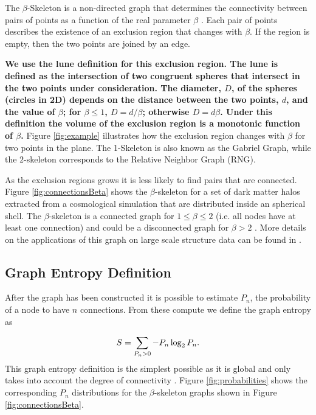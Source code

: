 \documentclass[fleqn,usenatbib]{mnras}
\begin{document}
The $\beta$-Skeleton is a non-directed graph that determines the
connectivity between pairs of points as a function of the real
parameter $\beta$ \citep{1985Kirkpatrick}. 
Each pair of points describes the existence of an exclusion region
that changes with $\beta$.  
If the region is empty, then the two points are joined by an edge. 

\textbf{We use the lune definition for this exclusion region.
The lune is defined as the intersection of two congruent spheres that
intersect in the two points under consideration.
The diameter, $D$, of the spheres (circles in 2D) depends on the
distance between the two points, $d$, and the value of $\beta$; for
$\beta \leq 1$, $D=d/\beta$; otherwise $D=d\beta$.
Under this definition the volume of the exclusion region is a
monotonic function of $\beta$.}
Figure \ref{fig:example} illustrates how the exclusion region changes with $\beta$ for 
two points in the plane. 
The 1-Skeleton is also known as the Gabriel Graph, while the
$2$-skeleton corresponds to the Relative Neighbor Graph (RNG). 

As the exclusion regions grows it is less likely to find pairs that are connected.
Figure \ref{fig:connectionsBeta} shows the $\beta$-skeleton for a set of dark matter halos extracted from a cosmological simulation that are distributed inside an spherical shell.
The $\beta$-skeleton is a connected graph for $1\leq \beta\leq 2$
(i.e. all nodes have at least
one connection) and could be a disconnected graph for $\beta>2$ \citep{bose2002spanning}.
More details on the applications of this graph on large scale structure data
can be found in \citep{2019MNRAS.485.5276F}.

\subsection{Graph Entropy Definition}

After the graph has been constructed it is possible to estimate $P_n$, the probability of 
a node to have $n$ connections.
From these compute we define the graph entropy as

\begin{equation}
\centering
    S = \displaystyle\sum_{P_n>0}-P_n\log_2{P_n}.
    \label{ecuacionEntropia}
\end{equation}
%
This graph entropy definition is the simplest possible as it is global and only 
takes into account the degree of connectivity \citep{2012Entrp..14..559M}. 
Figure \ref{fig:probabilities} shows the corresponding $P_n$ distributions for the 
$\beta$-skeleton graphs shown in Figure \ref{fig:connectionsBeta}.
\end{document}
